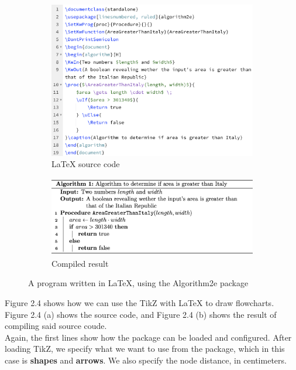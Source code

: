 \begin{figure}[ht]
\centering
\begin{subfigure}{.8\textwidth}
  \centering
  \includegraphics[width=1\linewidth]{assets/AGTI_TBP_s.png}
  \caption{LaTeX source code}
  \label{fig:AGTI_TBP_source_code}
\end{subfigure} \newline

\begin{subfigure}{.8\textwidth}
  \centering
  \includegraphics[width=1\linewidth]{assets/AGTI_TBP.png}
  \caption{Compiled result}
  \label{fig:AGTI_TBP_result}
\end{subfigure}
\caption{A program written in LaTeX, using the Algorithm2e package}
\label{fig:AGTI_TBP}
\end{figure}

Figure 2.4 shows how we can use the TikZ with LaTeX to draw flowcharts. Figure 2.4 (a) shows the source code, and Figure 2.4 (b) shows the result of compiling said source coude. \hfill \\

Again, the first lines show how the package can be loaded and configured. After loading TikZ, we specify what we want to use from the package, which in this case is \textbf{shapes} and \textbf{arrows}. We also specify the node distance, in centimeters. \hfill \\

